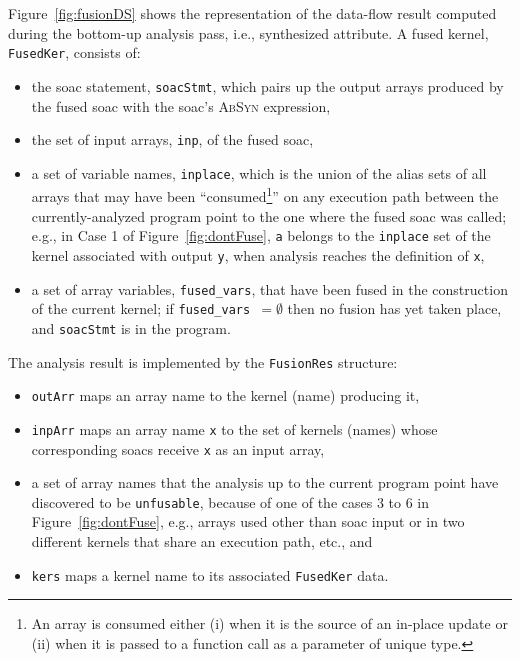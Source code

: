 \documentclass{sigplanconf}  %
\newcommand{\emp}[1]{\textcolor{DikuRed}{ #1}}
\begin{document}

Figure~\ref{fig:fusionDS} shows the representation of the data-flow result
computed during the bottom-up analysis pass, i.e., synthesized attribute.  
A fused kernel, \emp{\tt FusedKer}, consists of:
\begin{itemize}
    \item the {\sc soac} statement, {\tt soacStmt}, which pairs up
            the output arrays produced by the fused {\sc soac} 
            with the {\sc soac}'s \textsc{AbSyn} expression,
    \item the set of input arrays, {\tt inp}, of the fused {\sc soac},
    \item a set of variable names, {\tt inplace}, which is
            the union of the alias sets of all arrays that may have 
            been ``consumed\footnote{
                An array is consumed either (i) when it is the 
                source of an in-place update or (ii) when it is passed 
                to a function call as a parameter of unique type. 
            }''
            on any execution path between the currently-analyzed program 
            point to the one where the fused {\sc soac} was called; e.g.,
            in \emp{Case 1} of Figure~\ref{fig:dontFuse}, {\tt a}
            belongs to the {\tt inplace} set of the kernel associated
            with output {\tt y}, when analysis reaches 
            the definition of {\tt x},
    \item a set of array variables, {\tt fused\_vars}, that have been 
            fused in the construction of the current kernel;
            if {\tt fused\_vars $=\emptyset$} then no fusion has
            yet taken place, and {\tt soacStmt} is in the program.       
\end{itemize}

The analysis result is implemented by the \emp{\tt FusionRes} structure: 
\begin{itemize}
    \item {\tt outArr} maps an array name to the kernel (name) producing it, 
    \item {\tt inpArr} maps an array name {\tt x} to the set of kernels (names) 
            whose corresponding {\sc soac}s receive {\tt x} as an input array,
    \item a set of array names that the analysis up to the current 
            program point have discovered to be {\tt unfusable}, because
            of one of the \emp{cases 3 to 6} in Figure~\ref{fig:dontFuse},
            e.g., arrays used other than {\sc soac} input or
            in two different kernels that share an execution path, etc., and
    \item {\tt kers} maps a kernel name to its associated \emp{\tt FusedKer} data.
\end{itemize}
\end{document}
